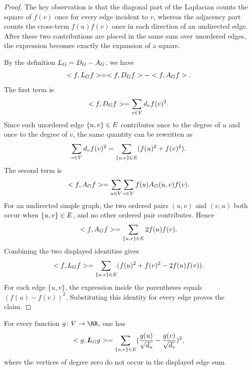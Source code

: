 \begin{proof}
	The key observation is that the diagonal part of the Laplacian counts the square of \(f(v)\) once for every edge incident to \(v\), whereas the adjacency part counts the cross-term \(f(u)f(v)\) once in each direction of an undirected edge. After these two contributions are placed in the same sum over unordered edges, the expression becomes exactly the expansion of a square.

	By the definition \(L_{G}=D_{G}-A_{G}\), we have
	\begin{equation}
		< f,L_{G}f>=< f,D_{G}f>-< f,A_{G}f>.
	\end{equation}
	The first term is
	\begin{equation}
		< f,D_{G}f>=\sum_{v\in V}d_v f(v)^2.
	\end{equation}
	Since each unordered edge \(\{u,v\}\in E\) contributes once to the degree of \(u\) and once to the degree of \(v\), the same quantity can be rewritten as
	\begin{equation}
		\sum_{v\in V}d_v f(v)^2=\sum_{\{u,v\}\in E}(f(u)^2+f(v)^2).
	\end{equation}
	The second term is
	\begin{equation}
		< f,A_{G}f>=\sum_{u\in V}\sum_{v\in V}f(u)A_{G}(u,v)f(v).
	\end{equation}
	For an undirected simple graph, the two ordered pairs \((u,v)\) and \((v,u)\) both occur when \(\{u,v\}\in E\), and no other ordered pair contributes. Hence
	\begin{equation}
		< f,A_{G}f>=\sum_{\{u,v\}\in E}2f(u)f(v).
	\end{equation}
	Combining the two displayed identities gives
	\begin{equation}
		< f,L_{G}f>=\sum_{\{u,v\}\in E}(f(u)^2+f(v)^2-2f(u)f(v)).
	\end{equation}
	For each edge \(\{u,v\}\), the expression inside the parentheses equals \(\left(f(u)-f(v)\right)^2\). Substituting this identity for every edge proves the claim.
\end{proof}

\begin{proposition}
	\label{prop:normalized-laplacian-dirichlet}
	For every function \(g\colon \Vertices\to\RR\), one has
	\begin{equation}
		< g,\boldsymbol{L}_{G}g>=\sum_{\{u,v\}\in E}(\frac{g(u)}{\sqrt{d_u}}-\frac{g(v)}{\sqrt{d_v}})^2,
	\end{equation}
	where the vertices of degree zero do not occur in the displayed edge sum.
\end{proposition}

